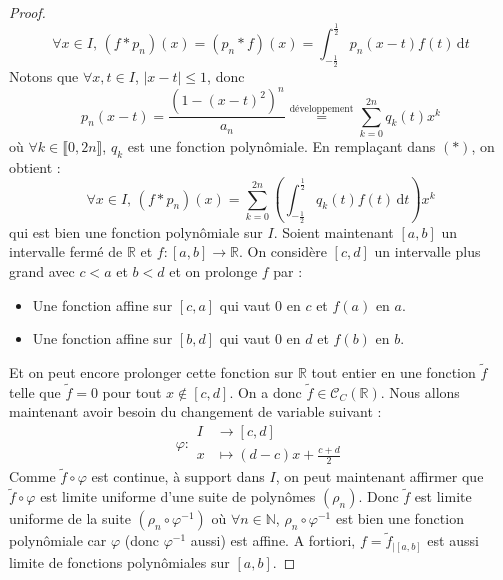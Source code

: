 \begin{proof}
		\[ \forall x \in I, \, (f*p_n)(x) = (p_n*f)(x) = \int_{-\frac{1}{2}}^{\frac{1}{2}} p_n(x-t) f(t) \, \mathrm{d}t \tag{$*$} \]
		Notons que $\forall x, t \in I$, $|x-t| \leq 1$, donc
		\[ p_n(x-t) = \frac{(1 - (x-t)^2)^n}{a_n} \overset{\text{développement}}{=} \sum_{k=0}^{2n} q_k(t) x^k \]
		où $\forall k \in \llbracket 0, 2n \rrbracket$, $q_k$ est une fonction polynômiale. En remplaçant dans $(*)$, on obtient :
		\[ \forall x \in I, \, (f*p_n)(x) = \sum_{k=0}^{2n} \left( \int_{-\frac{1}{2}}^{\frac{1}{2}} q_k(t) f(t) \, \mathrm{d}t \right) x^k \]
		qui est bien une fonction polynômiale sur $I$.
		\newpar
		Soient maintenant $[a,b]$ un intervalle fermé de $\mathbb{R}$ et $f : [a, b] \rightarrow \mathbb{R}$. On considère $[c, d]$ un intervalle plus grand avec $c < a$ et $b < d$ et on prolonge $f$ par :
		\begin{itemize}
			\item Une fonction affine sur $[c, a]$ qui vaut $0$ en $c$ et $f(a)$ en $a$.
			\item Une fonction affine sur $[b, d]$ qui vaut $0$ en $d$ et $f(b)$ en $b$.
		\end{itemize}
		Et on peut encore prolonger cette fonction sur $\mathbb{R}$ tout entier en une fonction $\widetilde{f}$ telle que $\widetilde{f} = 0$ pour tout $x \notin [c, d]$. On a donc $\widetilde{f} \in \mathcal{C}_C(\mathbb{R})$. Nous allons maintenant avoir besoin du changement de variable suivant :
		\[ \varphi :
		\begin{array}{cl}
			I &\rightarrow [c, d] \\
			x &\mapsto (d-c)x + \frac{c+d}{2}
		\end{array}
		\]
		Comme $\widetilde{f} \circ \varphi$ est continue, à support dans $I$, on peut maintenant affirmer que $\widetilde{f} \circ \varphi$ est limite uniforme d'une suite de polynômes $(\rho_n)$. Donc $\widetilde{f}$ est limite uniforme de la suite $(\rho_n \circ \varphi^{-1})$ où $\forall n \in \mathbb{N}$, $\rho_n \circ \varphi^{-1}$ est bien une fonction polynômiale car $\varphi$ (donc $\varphi^{-1}$ aussi) est affine. A fortiori, $f = \widetilde{f}_{|[a,b]}$ est aussi limite de fonctions polynômiales sur $[a,b]$.
	\end{proof}

